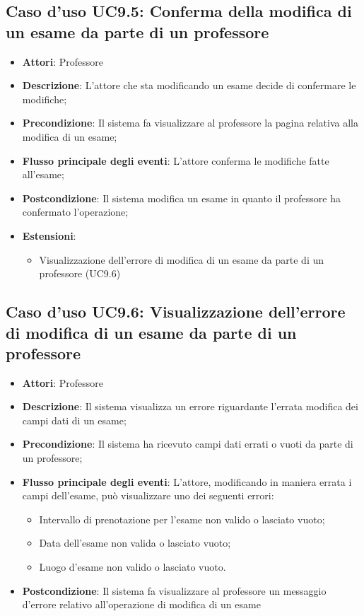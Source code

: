 \subsection{Caso d'uso \texorpdfstring{UC9.5}{UC9.5}: Conferma della modifica di un esame da parte di un professore}
\begin{itemize}
\item \textbf{Attori}: Professore
\item \textbf{Descrizione}: L'attore che sta modificando un esame decide di confermare le modifiche;
\item \textbf{Precondizione}: Il sistema fa visualizzare al professore la pagina relativa alla modifica di un esame;

\item \textbf{Flusso principale degli eventi}: L'attore conferma le modifiche fatte all'esame;
\item \textbf{Postcondizione}: Il sistema modifica un esame in quanto il professore ha confermato l'operazione;

\item \textbf{Estensioni}:
\begin{itemize}
\item Visualizzazione dell'errore di modifica di un esame da parte di un professore (UC9.6)
\end{itemize}
\end{itemize}
\subsection{Caso d'uso \texorpdfstring{UC9.6}{UC9.6}: Visualizzazione dell'errore di modifica di un esame da parte di un professore}
\begin{itemize}
\item \textbf{Attori}: Professore
\item \textbf{Descrizione}: Il sistema visualizza un errore riguardante l'errata modifica dei campi dati di un esame;
\item \textbf{Precondizione}: Il sistema ha ricevuto campi dati errati o vuoti da parte di un professore;

\item \textbf{Flusso principale degli eventi}: L'attore, modificando in maniera errata i campi dell'esame, può visualizzare uno dei seguenti errori: \begin{itemize}
\item Intervallo di prenotazione per l’esame non valido o lasciato vuoto;
\item Data dell’esame non valida o lasciato vuoto;
\item Luogo d’esame non valido o lasciato vuoto.
\end{itemize}
\item \textbf{Postcondizione}: Il sistema fa visualizzare al professore un messaggio d'errore relativo all'operazione di modifica di un esame

\end{itemize}
